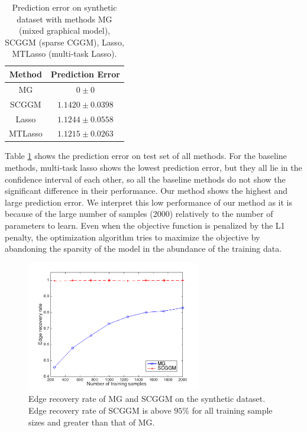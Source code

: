 \documentclass{article}
\begin{document}
\begin{table}
    \label{table:syn_pred_err}
    	\caption{Prediction error on synthetic dataset with methods MG (mixed graphical model), SCGGM (sparse CGGM), Lasso, MTLasso (multi-task Lasso).}
\begin{center}
    \begin{tabular}{| c | c |}
    \hline
    Method & Prediction Error \\
    \hline
    MG & $0 \pm 0$ \\
    SCGGM & $1.1420 \pm 0.0398$  \\
    Lasso & $1.1244 \pm 0.0558$  \\
    MTLasso & $1.1215 \pm 0.0263$ \\
    \hline 
    \end{tabular}
\end{center}
\end{table}
Table \ref{table:syn_pred_err} shows the prediction error on test set of all methods. For the baseline methods, multi-task lasso shows the lowest prediction error, but they all lie in the confidence interval of each other, so all the baseline methods do not show the significant difference in their performance. Our method shows the highest and large prediction error. We interpret this low performance of our method as it is because of the large number of samples (2000) relatively to the number of parameters to learn. Even when the objective function is penalized by the L1 penalty, the optimization algorithm tries to maximize the objective by abandoning the sparsity of the model in the abundance of the training data.

\begin{figure}[hb]
  \centering
  \label{fig:syn_edge_rec}
  \includegraphics[width=3in]{figure/figure1}
  \caption[] {Edge recovery rate of MG and SCGGM on the synthetic dataset. Edge recovery rate of SCGGM is above $95\%$ for all training sample sizes and greater than that of MG.}
\end{figure}
\end{document}
